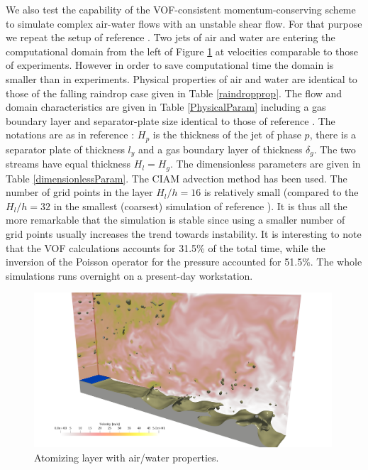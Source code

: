 We also test the capability of the VOF-consistent momentum-conserving scheme 
to simulate complex air-water flows with an unstable shear flow. For that 
purpose we repeat the setup of reference \cite{Ling16}. Two jets of air and water 
are entering the computational domain from the left of Figure \ref{atom}
at velocities comparable to those of experiments. However in order to 
save computational time the domain is smaller than in experiments. Physical 
properties of air and water are identical to those of the falling raindrop case 
given in Table \ref{raindropprop}. The flow and domain characteristics are 
given in Table \ref{PhysicalParam} including a gas boundary layer 
and separator-plate size identical to those of reference \cite{Ling16}. 
The notations are as in reference \cite{Ling16}: $H_p$ is the thickness of the
jet of phase $p$, there is a separator plate of thickness $l_y$ and a 
gas boundary layer of thickness $\delta_g$.  The two streams have 
equal thickness $H_l=H_g$. The dimensionless parameters are given in 
Table \ref{dimensionlessParam}. The CIAM advection method has been used. 
The number of grid points in the layer $H_l/h = 16$ is relatively small
(compared to the  $H_l/h = 32$ in the smallest (coarsest) simulation
of reference \cite{Ling16}). It is thus all the more remarkable that the 
simulation is stable since using a smaller number of grid points usually 
increases the trend towards instability. It is interesting to note 
that the VOF calculations accounts for 31.5\% of the total time, while the 
inversion of the Poisson operator for the pressure accounted for 51.5\%. 
The whole simulations runs overnight on a present-day workstation. 

\begin{figure}
\begin{center}
\includegraphics[width=0.99\textwidth]{Figures/Marco/vof-vel-atom.png}
\end{center}
\caption{Atomizing layer with air/water properties.}
\label{atom}
\end{figure}

